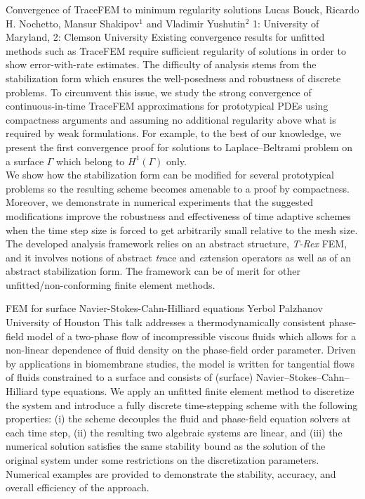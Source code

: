 \begin{addmargin}[2em]{0em}
\vspace{1.5ex}
\abs
{Convergence of TraceFEM to minimum regularity solutions}
{Lucas Bouck, Ricardo H. Nochetto, Mansur Shakipov$^{1}$ and Vladimir Yushutin$^{2}$}
{1: University of Maryland, 2: Clemson University}
{Existing convergence results for unfitted methods such as TraceFEM require sufficient regularity of solutions in order to show error-with-rate estimates. The difficulty of analysis stems from the stabilization form which ensures the well-posedness and robustness of discrete problems. To circumvent this issue, we study the strong convergence of continuous-in-time TraceFEM approximations for prototypical PDEs using compactness arguments and  assuming no additional regularity above what is required by weak formulations. For example, to the best of our knowledge, we present the first convergence proof for solutions to Laplace--Beltrami problem on a surface $\Gamma$ which belong to $H^1(\Gamma)$ only.\\
We show how the stabilization form can be modified for several prototypical problems so the resulting scheme becomes amenable to a proof by compactness. Moreover, we demonstrate in numerical experiments that the suggested modifications improve  the robustness and effectiveness of time adaptive schemes when the time step size is forced to get arbitrarily small relative to the mesh size.\\
The developed analysis framework relies on an abstract structure,  \textit{T-Rex} FEM, and it
involves notions of abstract \textit{tr}ace  and \textit{ex}tension operators as well as of an abstract
stabilization form. The framework can be of merit for other unfitted/non-conforming finite
element methods.}


\vspace{1.5ex}
\abs
{FEM for surface Navier-Stokes-Cahn-Hilliard equations}
{Yerbol Palzhanov}
{University of Houston}
{This talk addresses a thermodynamically consistent phase-field model of a two-phase flow of incompressible viscous fluids which allows for a non-linear dependence of fluid density on the
phase-field order parameter. Driven by applications in biomembrane studies, the model is written for
tangential flows of fluids constrained to a surface and consists of (surface) Navier–Stokes–Cahn–Hilliard
type equations. We apply an unfitted finite element method to discretize the system and introduce a
fully discrete time-stepping scheme with the following properties: (i) the scheme decouples the fluid
and phase-field equation solvers at each time step, (ii) the resulting two algebraic systems are linear,
and (iii) the numerical solution satisfies the same stability bound as the solution of the original system
under some restrictions on the discretization parameters. Numerical examples are provided to demonstrate the stability, accuracy, and overall efficiency of the approach.}



\end{addmargin}
